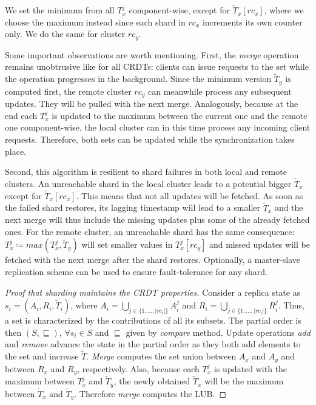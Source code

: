 We set the minimum from all $T_{x}^{j}$ component-wise, except for
$\tilde{T}_{x}[rc_{x}]$, where we choose the maximum instead since each shard in
$rc_{x}$ increments its own counter only. We do the same for cluster $rc_{y}$.

Some important observations are worth mentioning. First, the \textit{merge}
operation remains unobtrusive like for all CRDTs: clients can issue requests to
the set while the operation progresses in the background. Since the minimum
version $\tilde{T}_{y}$ is computed first, the remote cluster $rc_{y}$ can
meanwhile process any subsequent updates. They will be pulled with the next
merge. Analogously, because at the end each $T_{x}^{j}$ is updated to the
maximum between the current one and the remote one component-wise, the local
cluster can in this time process any incoming client requests. Therefore, both
sets can be updated while the synchronization takes place. 

Second, this algorithm is resilient to shard failures in both local and remote
clusters. An unreachable shard in the local cluster leads to a potential bigger
$\tilde{T}_{x}$ except for $\tilde{T}_{x}[rc_{x}]$. This means that not all
updates will be fetched. As soon as the failed shard restores, its lagging
timestamp will lead to a smaller $\tilde{T}_{x}$ and the next merge will thus
include the missing updates plus some of the already fetched ones. For the
remote cluster, an unreachable shard has the same consequence: $T_{x}^{j}
\coloneqq max(T_{x}^{j}, \tilde{T}_{y})$ will set smaller values in
$T_{x}^{j}[rc_{y}]$ and missed updates will be fetched with the next merge after
the shard restores. Optionally, a master-slave replication scheme can be used to
ensure fault-tolerance for any shard.

\begin{proof}[Proof that sharding maintains the CRDT properties]
Consider a replica state as $s_{i} = (A_{i}, R_{i}, \tilde{T}_{i})$, where
$A_{i} = \bigcup_{j \in \{1,\ldots,|rc_{i}|\}} A_{i}^{j}$ and $R_{i} =
\bigcup_{j \in \{1,\ldots,|rc_{i}|\}} R_{i}^{j}$. Thus, a set is characterized
by the contributions of all its subsets. The partial order is then $(S,
\sqsubseteq)$, $\forall s_{i} \in S$ and $\sqsubseteq$ given by \textit{compare}
method. Update operations \textit{add} and \textit{remove} advance the state in
the partial order as they both add elements to the set and increase $\tilde{T}$.
\textit{Merge} computes the set union between $A_{x}$ and $A_{y}$ and between
$R_{x}$ and $R_{y}$, respectively. Also, because each $T_{x}^{j}$ is updated
with the maximum between $T_{x}^{j}$ and $\tilde{T}_{y}$, the newly obtained
$\tilde{T}_{x}$ will be the maximum between $\tilde{T}_{x}$ and $\tilde{T}_{y}$.
Therefore \textit{merge} computes the LUB.
\end{proof}